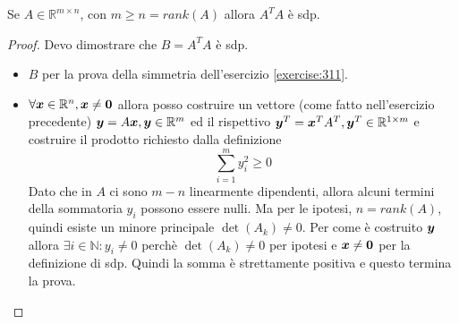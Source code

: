 \begin{exercise}[3.12]
Se $A \in \mathbb{R}^{m \times n}$, con $m \geq n = rank(A)$ allora $A^{T}A$ \`e
sdp.
\end{exercise}
\begin{proof}
Devo dimostrare che $B = A^{T}A$ \`e sdp.
\begin{itemize}
  \item $B$ per la prova della simmetria dell'esercizio
  \ref{exercise:311}.
  \item $\forall \boldsymbol{x} \in \mathbb{R}^{n}, \boldsymbol{x} \not = \boldsymbol{0}$ allora
  posso costruire un vettore (come fatto nell'esercizio precedente) $\boldsymbol{y} =
  A\boldsymbol{x}, \boldsymbol{y} \in \mathbb{R}^{m}$ ed il rispettivo $\boldsymbol{y}^{T} = 
  \boldsymbol{x}^{T}A^{T}, \boldsymbol{y}^{T} \in \mathbb{R}^{1 \times m}$ e costruire il 
  prodotto richiesto dalla definizione
  \begin{displaymath}
  	\sum_{i = 1}^{m}{y_{i}^{2}} \geq 0
  \end{displaymath}
  Dato che in $A$ ci sono $m-n$ linearmente dipendenti, allora alcuni termini
  della sommatoria $y_{i}$ possono essere nulli. Ma per le ipotesi, $n =
  rank(A)$, quindi esiste un minore principale $\det(A_{k}) \not = 0$. Per come
  \`e costruito $\boldsymbol{y}$ allora $\exists i \in \mathbb{N}: y_{i} \not = 0$
  perch\`e $\det(A_{k}) \not = 0$ per ipotesi e $\boldsymbol{x} \not = \boldsymbol{0}$ per
  la definizione di sdp. Quindi la somma \`e strettamente positiva e questo
  termina la prova.
\end{itemize}
\end{proof}

